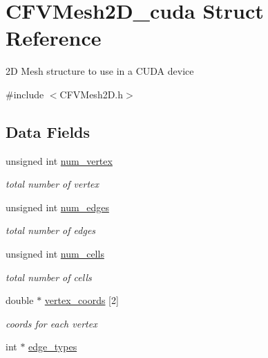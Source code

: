 \hypertarget{structFVL_1_1CFVMesh2D__cuda}{
\section{CFVMesh2D\_\-cuda Struct Reference}
\label{dd/d46/structFVL_1_1CFVMesh2D__cuda}
}


2D Mesh structure to use in a CUDA device  




{\ttfamily \#include $<$CFVMesh2D.h$>$}

\subsection*{Data Fields}
\begin{DoxyCompactItemize}
\item 
unsigned int \hyperlink{structFVL_1_1CFVMesh2D__cuda_a66b841fd6e58a9fc9b63df4fe982178f}{num\_\-vertex}
\begin{DoxyCompactList}\small\item\em total number of vertex \item\end{DoxyCompactList}\item 
unsigned int \hyperlink{structFVL_1_1CFVMesh2D__cuda_ad1228ae08a3c287de40e4682e6538c12}{num\_\-edges}
\begin{DoxyCompactList}\small\item\em total number of edges \item\end{DoxyCompactList}\item 
unsigned int \hyperlink{structFVL_1_1CFVMesh2D__cuda_aede6f897b05f909a426f36f61b2b8d43}{num\_\-cells}
\begin{DoxyCompactList}\small\item\em total number of cells \item\end{DoxyCompactList}\item 
double $\ast$ \hyperlink{structFVL_1_1CFVMesh2D__cuda_a03658bd1b0082d5bd0726d7ef81c0bc2}{vertex\_\-coords} \mbox{[}2\mbox{]}
\begin{DoxyCompactList}\small\item\em coords for each vertex \item\end{DoxyCompactList}\item 
int $\ast$ \hyperlink{structFVL_1_1CFVMesh2D__cuda_a6a62f4029cdd76f0ca586851d6eaf684}{edge\_\-types}

\end{DoxyCompactItemize}
